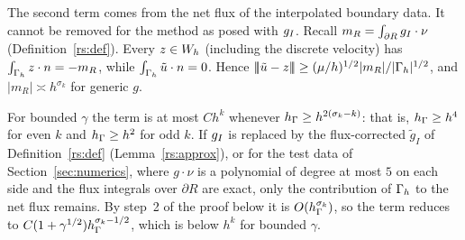 The second term comes from the net flux of the interpolated boundary data. It cannot be removed for the method as posed with $g_I$. Recall $m_R=\int_{\partial R}g_I\cdot\nu$ (Definition~\ref{rs:def}). Every $z\in W_h$ (including the discrete velocity) has $\int_{\Gamma_h}z\cdot n=-m_R$, while $\int_{\Gamma_h}\tilde u\cdot n=0$. Hence $|\!|\!|\tilde u-z|\!|\!|\ge(\mu/h)^{1/2}|m_R|/|\Gamma_h|^{1/2}$, and $|m_R|\asymp h^{\sigma_k}$ for generic $g$.

For bounded $\gamma$ the term is at most $Ch^k$ whenever $h_\Gamma\ge h^{2(\sigma_k-k)}$: that is, $h_\Gamma\ge h^4$ for even $k$ and $h_\Gamma\ge h^2$ for odd $k$. If $g_I$ is replaced by the flux-corrected $\tilde g_I$ of Definition~\ref{rs:def} (Lemma~\ref{rs:approx}), or for the test data of Section~\ref{sec:numerics}, where $g\cdot\nu$ is a polynomial of degree at most $5$ on each side and the flux integrals over $\partial R$ are exact, only the contribution of $\Gamma_h$ to the net flux remains. By step~2 of the proof below it is $O(h_\Gamma^{\sigma_k})$, so the term reduces to $C(1+\gamma^{1/2})h_\Gamma^{\sigma_k-1/2}$, which is below $h^k$ for bounded $\gamma$.

